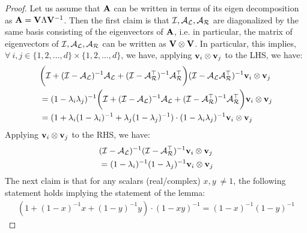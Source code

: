 \begin{proof}
	Let us assume that $\mathbf{A}$ can be written in terms of its eigen decomposition as $\mathbf{A} = \mathbf{V}\Lambda\mathbf{V}^{-1}$.
	Then the first claim is that $\mathcal{I},\mathcal{A}_{\mathcal{L}},\mathcal{A}_{\mathcal{R}}$ are diagonalized by the same basis consisting of the eigenvectors of $\mathbf{A}$, i.e. in particular, the matrix of eigenvectors of $\mathcal{I},\mathcal{A}_{\mathcal{L}},\mathcal{A}_{\mathcal{R}}$ can be written as $\mathbf{V}\otimes\mathbf{V}$. In particular, this implies, $\forall\ i,j\in\{1,2,...,d\}\times\{1,2,...,d\}$, we have, applying $\mathbf{v}_i\otimes\mathbf{v}_j$ to the LHS, we have:
	\begin{align*}
	&\bigg(\mathcal{I} + (\mathcal{I}-\mathcal{A}_{\mathcal{L}})^{-1}\mathcal{A}_{\mathcal{L}} + (\mathcal{I}-\mathcal{A}_{\mathcal{R}}^{\top})^{-1}\mathcal{A}_{\mathcal{R}}^{\top}\bigg)(\mathcal{I}-\mathcal{A}_{\mathcal{L}}\mathcal{A}_{\mathcal{R}}^{\top})^{-1} \mathbf{v}_i\otimes\mathbf{v}_j\\
	&=(1-\lambda_i\lambda_j)^{-1}\bigg(\mathcal{I} + (\mathcal{I}-\mathcal{A}_{\mathcal{L}})^{-1}\mathcal{A}_{\mathcal{L}} + (\mathcal{I}-\mathcal{A}_{\mathcal{R}}^{\top})^{-1}\mathcal{A}_{\mathcal{R}}^{\top}\bigg)\mathbf{v}_i\otimes\mathbf{v}_j\\
	&=(1+\lambda_i(1-\lambda_i)^{-1}+\lambda_j(1-\lambda_j)^{-1})\cdot(1-\lambda_i\lambda_j)^{-1}\mathbf{v}_i\otimes\mathbf{v}_j
	\end{align*}
	Applying $\mathbf{v}_i\otimes\mathbf{v}_j$ to the RHS, we have:
	\begin{align*}
	&(\mathcal{I}-\mathcal{A}_{\mathcal{L}})^{-1}(\mathcal{I}-\mathcal{A}_{\mathcal{R}}^{\top})^{-1}\mathbf{v}_i\otimes\mathbf{v}_j\\
	&=(1-\lambda_i)^{-1}(1-\lambda_j)^{-1}\mathbf{v}_i\otimes\mathbf{v}_j
	\end{align*}
	The next claim is that for any scalars (real/complex) $x,y~\ne 1$, the following statement holds implying the statement of the lemma:
	\begin{align*}
	(1+(1-x)^{-1}x+(1-y)^{-1}y)\cdot(1-xy)^{-1}=(1-x)^{-1}(1-y)^{-1}
	\end{align*}
\end{proof}


